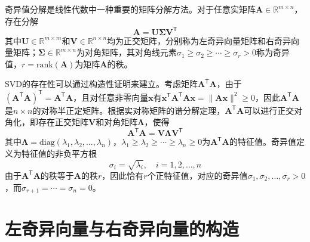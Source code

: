 \documentclass[a4paper,12pt]{ctexrep}
\begin{document}
奇异值分解是线性代数中一种重要的矩阵分解方法。对于任意实矩阵$\bm{A}\in\mathbb{R}^{m\times n}$，存在分解
\begin{equation}
    \bm{A} = \bm{U}\bm{\Sigma}\bm{V}^{\mathsf{T}}
\end{equation}
其中$\bm{U}\in\mathbb{R}^{m\times m}$和$\bm{V}\in\mathbb{R}^{n\times n}$均为正交矩阵，分别称为左奇异向量矩阵和右奇异向量矩阵；$\bm{\Sigma}\in\mathbb{R}^{m\times n}$为对角矩阵，其对角线元素$\sigma_1\geq\sigma_2\geq\cdots\geq\sigma_r>0$称为奇异值，$r=\mathrm{rank}(\bm{A})$为矩阵$\bm{A}$的秩。

SVD的存在性可以通过构造性证明来建立。考虑矩阵$\bm{A}^{\mathsf{T}}\bm{A}$，由于$(\bm{A}^{\mathsf{T}}\bm{A})^{\mathsf{T}}=\bm{A}^{\mathsf{T}}\bm{A}$，且对任意非零向量$\bm{x}$有$\bm{x}^{\mathsf{T}}\bm{A}^{\mathsf{T}}\bm{A}\bm{x}=\|\bm{A}\bm{x}\|^2\geq 0$，因此$\bm{A}^{\mathsf{T}}\bm{A}$是$n\times n$的对称半正定矩阵。根据实对称矩阵的谱分解定理，$\bm{A}^{\mathsf{T}}\bm{A}$可以进行正交对角化，即存在正交矩阵$\bm{V}$和对角矩阵$\bm{\Lambda}$，使得
\begin{equation}
    \bm{A}^{\mathsf{T}}\bm{A} = \bm{V}\bm{\Lambda}\bm{V}^{\mathsf{T}}
\end{equation}
其中$\bm{\Lambda}=\mathrm{diag}(\lambda_1,\lambda_2,\ldots,\lambda_n)$，$\lambda_1\geq\lambda_2\geq\cdots\geq\lambda_n\geq 0$为$\bm{A}^{\mathsf{T}}\bm{A}$的特征值。奇异值定义为特征值的非负平方根
\begin{equation}
    \sigma_i = \sqrt{\lambda_i}, \quad i=1,2,\ldots,n
\end{equation}
由于$\bm{A}^{\mathsf{T}}\bm{A}$的秩等于$\bm{A}$的秩$r$，因此恰有$r$个正特征值，对应的奇异值$\sigma_1,\sigma_2,\ldots,\sigma_r>0$，而$\sigma_{r+1}=\cdots=\sigma_n=0$。

\section{左奇异向量与右奇异向量的构造}
\end{document}
